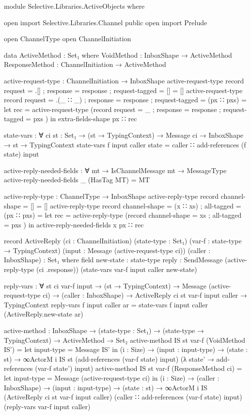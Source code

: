 \begin{code}
module Selective.Libraries.ActiveObjects where

open import Selective.Libraries.Channel public
open import Prelude

open ChannelType
open ChannelInitiation

data ActiveMethod : Set₁ where
  VoidMethod : InboxShape → ActiveMethod
  ResponseMethod : ChannelInitiation → ActiveMethod

active-request-type : ChannelInitiation → InboxShape
active-request-type record { request = .[] ; response = response ; request-tagged = [] } = []
active-request-type record { request = .(_ ∷ _) ; response = response ; request-tagged = (px ∷ pxs) } =
  let rec = active-request-type (record { request = _ ; response = response ; request-tagged = pxs })
  in extra-fields-shape px ∷ rec

state-vars : ∀ {ci} {st : Set₁} → (st → TypingContext) → Message ci → InboxShape → st → TypingContext
state-vars f input caller state = caller ∷ add-references (f state) input


active-reply-needed-fields : ∀ mt → IsChannelMessage mt → MessageType
active-reply-needed-fields _ (HasTag MT) = MT

active-reply-type : ChannelType → InboxShape
active-reply-type record { channel-shape = [] } = []
active-reply-type record { channel-shape = (x ∷ xs) ; all-tagged = (px ∷ pxs) } =
  let rec = active-reply-type (record { channel-shape = xs ; all-tagged = pxs })
  in active-reply-needed-fields x px ∷ rec

record ActiveReply (ci : ChannelInitiation) (state-type : Set₁) (var-f : state-type → TypingContext) (input : Message (active-request-type ci)) (caller : InboxShape) : Set₁ where
  field
    new-state : state-type
    reply : SendMessage (active-reply-type (ci .response)) (state-vars var-f input caller new-state)

reply-vars : ∀ {st ci var-f input} → (st → TypingContext) → Message (active-request-type ci) → (caller : InboxShape) → ActiveReply ci st var-f input caller → TypingContext
reply-vars f input caller ar = state-vars f input caller (ActiveReply.new-state ar)

active-method : InboxShape → (state-type : Set₁) → (state-type → TypingContext) → ActiveMethod → Set₂
active-method IS st var-f (VoidMethod IS') =
  let input-type = Message IS'
  in (i : Size) →
     (input : input-type) →
     (state : st) →
     ∞ActorM i IS
       st
       (add-references (var-f state) input)
       (λ state' → add-references (var-f state') input)
active-method IS st var-f (ResponseMethod ci) =
  let input-type = Message (active-request-type ci)
  in (i : Size) →
     (caller : InboxShape) →
     (input : input-type) →
     (state : st) →
     ∞ActorM i IS
       (ActiveReply ci st var-f input caller)
       (caller ∷ add-references (var-f state) input)
       (reply-vars var-f input caller)


\end{code}
